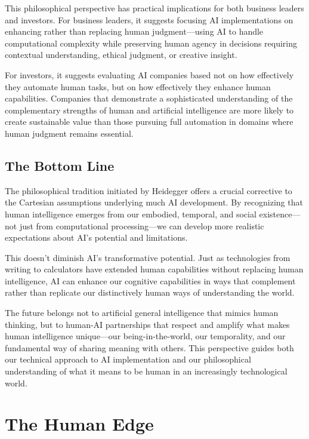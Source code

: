 \documentclass[
  Letterpaper,
]{scrbook}
\begin{document}
This philosophical perspective has practical implications for both
business leaders and investors. For business leaders, it suggests
focusing AI implementations on enhancing rather than replacing human
judgment---using AI to handle computational complexity while preserving
human agency in decisions
requiring contextual understanding, ethical judgment, or creative
insight.

For investors, it suggests evaluating AI companies based not on how
effectively they automate human tasks, but on how effectively they
enhance human capabilities. Companies that demonstrate a sophisticated
understanding of the complementary strengths of human and artificial
intelligence are more likely to create sustainable value than those
pursuing full automation in domains where
human judgment remains essential.

\section{The Bottom Line}\label{the-bottom-line}

The philosophical tradition initiated by Heidegger offers a crucial
corrective to the Cartesian assumptions underlying much AI development.
By recognizing that human intelligence emerges from our embodied,
temporal, and social existence---not just from computational
processing---we can develop more realistic expectations about AI's
potential and limitations.

This doesn't diminish AI's transformative potential. Just as
technologies from writing to calculators have extended human
capabilities without replacing human intelligence, AI can enhance our
cognitive capabilities in ways that complement rather than replicate our
distinctively human ways of understanding the world.

The future belongs not to artificial general intelligence that mimics
human thinking, but to human-AI partnerships that respect and amplify
what makes human intelligence unique---our being-in-the-world, our
temporality, and our fundamental way of sharing meaning with others.
This perspective guides both our technical approach to AI implementation
and our philosophical understanding of what it means to be human in an
increasingly technological world.


\chapter{The Human Edge}\label{the-human-edge}
\end{document}
